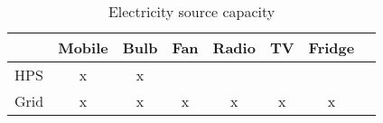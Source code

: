 \begin{table}[htbp]\centering
\caption{Electricity source capacity}
\begin{tabular}{l*{7}{c}}
\toprule
                &     Mobile&      Bulb&     Fan & Radio & TV  & Fridge\\
\midrule
HPS             &  x &   x &   & & & \\

Grid            &   x&    x&    x & x & x & x\\

      
\bottomrule
\end{tabular}
\end{table}